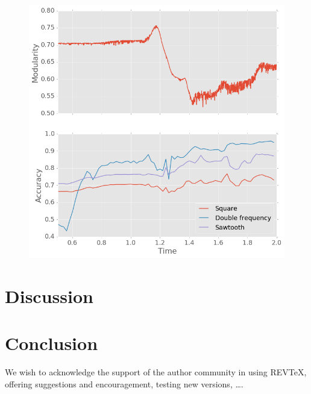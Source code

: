 \documentclass[%
 reprint,
 amsmath,amssymb,
 aps,
]{revtex4-2}
\begin{document}
\begin{figure}[h]
	\centering
	\includegraphics[width=1\linewidth]{figure/pre_act_task}
	\caption{}
	\label{fig:pre_act_task}
\end{figure}

 


\newpage
\section{\label{sec:level1} Discussion}

\section{\label{sec:level1} Conclusion}








\begin{acknowledgments}
We wish to acknowledge the support of the author community in using
REV\TeX{}, offering suggestions and encouragement, testing new versions,
\dots.
\end{acknowledgments}
\end{document}
